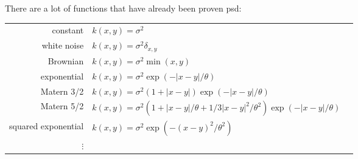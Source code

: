 \documentclass{beamer}
\begin{document}
\begin{frame}{}
There are a lot of functions that have already been proven psd:\\
\vspace{2mm}
\footnotesize
\begin{tabular}{rlN}
		constant & $ \displaystyle k(x,y) = \sigma^2 $ &\\[4mm]
		white noise & $ \displaystyle k(x,y) = \sigma^2 \delta_{x,y} $ &\\[4mm]
		Brownian & $ \displaystyle k(x,y) =  \sigma^2  \min (x,y) $ &\\[4mm]
		exponential & $\displaystyle k(x,y) =  \sigma^2 \exp \left(- |x-y|/\theta \right)$ &\\[4mm]
		Matern 3/2 & $\displaystyle k(x,y) =  \sigma^2 \left(1 + |x-y| \right) \exp \left(- |x-y| /\theta\right)$ &\\[4mm]
		Matern 5/2 & $\displaystyle k(x,y) =  \sigma^2 \left(1 + |x-y| /\theta+ 1/3|x-y|^2 /\theta^2 \right) \exp \left(- |x-y| /\theta\right)$ &\\[4mm]
		\hspace{-5mm}squared exponential & $\displaystyle k(x,y) =  \sigma^2 \exp \left(- (x-y)^2 /\theta^2 \right)$ &\\[4mm]
		$\vdots$ &
\end{tabular}\\

\end{frame}
\end{document}
